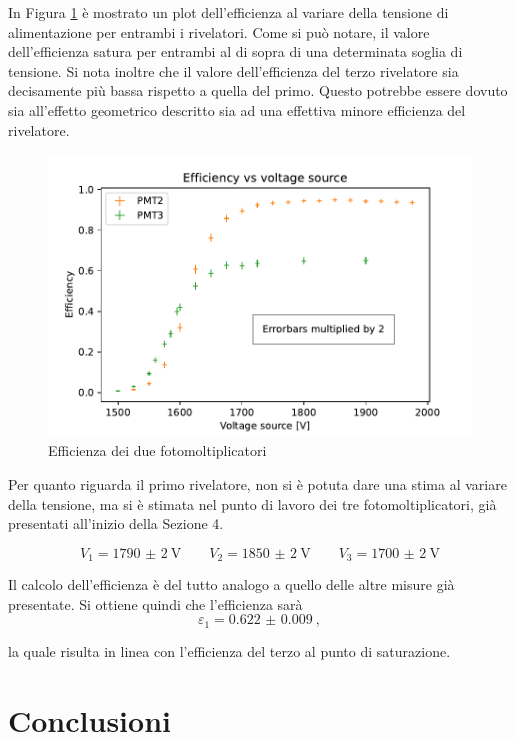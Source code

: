 \documentclass[10pt,a4paper]{article}
\begin{document}
In Figura \ref{fig:eff} è mostrato un plot dell'efficienza al variare della tensione di alimentazione per entrambi i rivelatori. Come si può notare, il valore dell'efficienza satura per entrambi al di sopra di una determinata soglia di tensione. Si nota inoltre che il valore dell'efficienza del terzo rivelatore sia decisamente più bassa rispetto a quella del primo. Questo potrebbe essere dovuto sia all'effetto geometrico descritto sia ad una effettiva  minore efficienza del rivelatore.

\begin{figure}[h]
    \centering
    \includegraphics[width=\columnwidth]{img/eff.pdf}
    \caption{Efficienza dei due fotomoltiplicatori}
    \label{fig:eff}
\end{figure}


Per quanto riguarda il primo rivelatore, non si è potuta dare una stima al variare della tensione, ma si è stimata nel punto di lavoro dei tre fotomoltiplicatori, già presentati all'inizio della Sezione 4. 

\[ V_1=\SI{1790(2)}{\volt} \quad\quad V_2=\SI{1850(2)}{\volt} \quad\quad V_3=\SI{1700(2)}{\volt} \]

Il calcolo dell'efficienza è del tutto analogo a quello delle altre misure già presentate. Si ottiene quindi che l'efficienza sarà
\[  \varepsilon_1 = \SI{0.622(9)}{}, \]

la quale risulta in linea con l'efficienza del terzo al punto di saturazione.


\section{Conclusioni}
\end{document}
